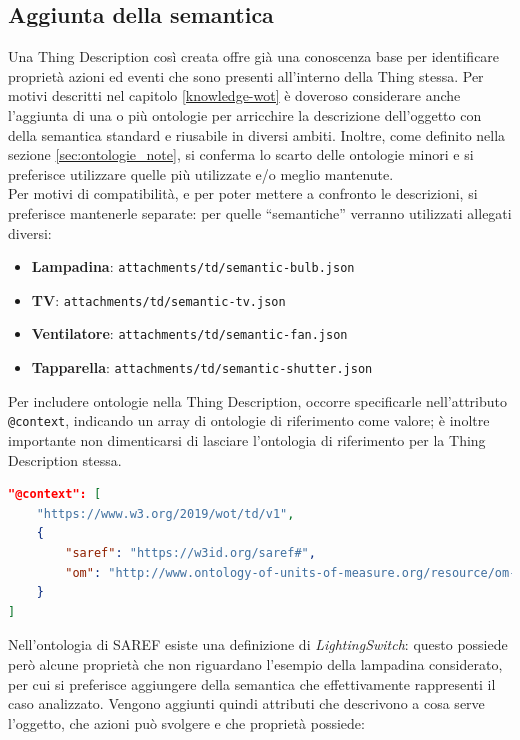 \documentclass[12pt,a4paper,openright,oneside]{report}
\newcommand{\quotes}[1]{``#1''}
\begin{document}
\subsection{Aggiunta della semantica}
\label{sec:adding-semantic}
Una Thing Description così creata offre già una conoscenza base per identificare proprietà azioni ed eventi che sono presenti all'interno della Thing stessa. Per motivi descritti nel capitolo \ref{knowledge-wot} è doveroso considerare anche l'aggiunta di una o più ontologie per arricchire la descrizione dell'oggetto con della semantica standard e riusabile in diversi ambiti. Inoltre, come definito nella sezione \ref{sec:ontologie_note}, si conferma lo scarto delle ontologie minori e si preferisce utilizzare quelle più utilizzate e/o meglio mantenute.\\

Per motivi di compatibilità, e per poter mettere a confronto le descrizioni, si preferisce mantenerle separate: per quelle \quotes{semantiche} verranno utilizzati allegati diversi:
\begin{itemize}
	\setlength\itemsep{-0.3em}
	\item \textbf{Lampadina}: \texttt{attachments/td/semantic-bulb.json}
	\item \textbf{TV}: \texttt{attachments/td/semantic-tv.json}
	\item \textbf{Ventilatore}: \texttt{attachments/td/semantic-fan.json}
	\item \textbf{Tapparella}: \texttt{attachments/td/semantic-shutter.json}
\end{itemize}

Per includere ontologie nella Thing Description, occorre specificarle nell'attributo \texttt{@context}, indicando un array di ontologie di riferimento come valore; è inoltre importante non dimenticarsi di lasciare l'ontologia di riferimento per la Thing Description stessa.

\begin{lstlisting}[language=json,caption={Aggiunta del contesto per includere ontologie},label=lst:semantic-td1]
"@context": [
	"https://www.w3.org/2019/wot/td/v1",
	{
		"saref": "https://w3id.org/saref#",
		"om": "http://www.ontology-of-units-of-measure.org/resource/om-2/"
	}
]
\end{lstlisting}

Nell'ontologia di SAREF esiste una definizione di \textit{LightingSwitch}: questo possiede però alcune proprietà che non riguardano l'esempio della lampadina considerato, per cui si preferisce aggiungere della semantica che effettivamente rappresenti il caso analizzato. Vengono aggiunti quindi attributi che descrivono a cosa serve l'oggetto, che azioni può svolgere e che proprietà possiede:
\end{document}
